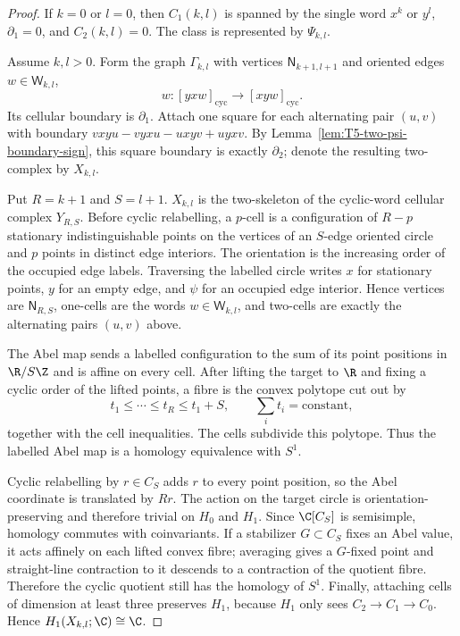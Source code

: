 \begin{proof}
  If \(k=0\) or \(l=0\), then \(C_1(k,l)\) is spanned by the single word
  \(x^k\) or \(y^l\), \(\partial_1=0\), and \(C_2(k,l)=0\).  The class is
  represented by \(\Psi_{k,l}\).

  Assume \(k,l>0\).  Form the graph \(\Gamma_{k,l}\) with vertices
  \(\mathsf N_{k+1,l+1}\) and oriented edges \(w\in\mathsf W_{k,l}\),
  \[
    w:[yxw]_{\mathrm{cyc}}\longrightarrow[xyw]_{\mathrm{cyc}}.
  \]
  Its cellular boundary is \(\partial_1\).  Attach one square for each
  alternating pair \((u,v)\) with boundary
  \(vxyu-vyxu-uxyv+uyxv\).  By
  Lemma~\ref{lem:T5-two-psi-boundary-sign}, this square boundary is
  exactly \(\partial_2\); denote the resulting two-complex by
  \(X_{k,l}\).

  Put \(R=k+1\) and \(S=l+1\).  \(X_{k,l}\) is the two-skeleton of the
  cyclic-word cellular complex \(Y_{R,S}\).  Before cyclic
  relabelling, a \(p\)-cell is a configuration of \(R-p\) stationary
  indistinguishable points on the vertices of an \(S\)-edge oriented
  circle and \(p\) points in distinct edge interiors.  The
  orientation is the increasing order of the occupied edge labels.
  Traversing the labelled circle writes \(x\) for stationary points, \(y\)
  for an empty edge, and \(\psi\) for an occupied edge interior.  Hence vertices are
  \(\mathsf N_{R,S}\), one-cells are the words \(w\in\mathsf W_{k,l}\),
  and two-cells are exactly the alternating pairs \((u,v)\) above.

  The Abel map sends a labelled configuration to the sum of its point
  positions in \(\R/S\Z\) and is affine on every cell.  After lifting the
  target to \(\R\) and fixing a cyclic order of the lifted points, a fibre
  is the convex polytope cut out by
  \[
    t_1\leq\cdots\leq t_R\leq t_1+S,\qquad \sum_i t_i=\mathrm{constant},
  \]
    together with the cell inequalities.  The cells
  subdivide this polytope.  Thus the labelled Abel map is a homology
  equivalence with \(S^1\).

  Cyclic relabelling by \(r\in C_S\) adds \(r\) to every point position, so
  the Abel coordinate is translated by \(Rr\).  The action on the target
  circle is orientation-preserving and therefore trivial on \(H_0\) and
  \(H_1\).  Since \(\C[C_S]\) is semisimple, homology commutes with
  coinvariants.  If a stabilizer \(G\subset C_S\) fixes an Abel value, it
  acts affinely on each lifted convex fibre; averaging gives a
  \(G\)-fixed point and straight-line contraction to it descends to a
  contraction of the quotient fibre.  Therefore the cyclic quotient still
  has the homology of \(S^1\).  Finally, attaching cells of dimension
  at least three preserves \(H_1\), because \(H_1\) only sees
  \(C_2\to C_1\to C_0\).  Hence \(H_1(X_{k,l};\C)\cong\C\).


\end{proof}
